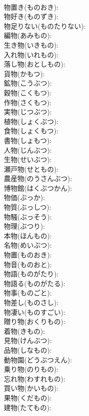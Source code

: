 \documentclass[8pt]{extreport}
\begin{document}
\begin{CJK}{UTF8}{min}
\\	物置き(ものおき): 
\\	物好き(ものずき): 
\\	物足りない(ものたりない): 
\\	編物(あみもの): 
\\	生き物(いきもの): 
\\	入れ物(いれもの): 
\\	落し物(おとしもの): 
\\	貨物(かもつ): 
\\	鉱物(こうぶつ): 
\\	穀物(こくもつ): 
\\	作物(さくもつ): 
\\	実物(じつぶつ): 
\\	植物(しょくぶつ): 
\\	食物(しょくもつ): 
\\	書物(しょもつ): 
\\	人物(じんぶつ): 
\\	生物(せいぶつ): 
\\	瀬戸物(せともの): 
\\	農産物(のうさんぶつ): 
\\	博物館(はくぶつかん): 
\\	物価(ぶっか): 
\\	物質(ぶっしつ): 
\\	物騒(ぶっそう): 
\\	物理(ぶつり): 
\\	本物(ほんもの): 
\\	名物(めいぶつ): 
\\	物置(ものおき): 
\\	物音(ものおと): 
\\	物語(ものがたり): 
\\	物語る(ものがたる): 
\\	物事(ものごと): 
\\	物差し(ものさし): 
\\	物凄い(ものすごい): 
\\	贈り物(おくりもの): 
\\	着物(きもの): 
\\	見物(けんぶつ): 
\\	品物(しなもの): 
\\	動物園(どうぶつえん): 
\\	乗り物(のりもの): 
\\	忘れ物(わすれもの): 
\\	買い物(かいもの): 
\\	果物(くだもの): 
\\	建物(たてもの): 

\end{CJK}
\end{document}
